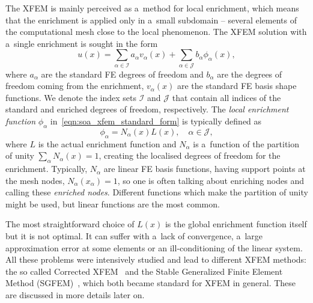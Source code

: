 The XFEM is mainly perceived as a~method for local enrichment, which means that the enrichment is applied only
in a~small subdomain -- several elements of the computational mesh close to the local phenomenon.
The XFEM solution with a~single enrichment is sought in the form
\begin{equation} \label{eqn:soa_xfem_standard_form}
  u(x) = \sum_{\alpha\in\mathcal{I}}a_\alpha v_\alpha(x)
    + \sum_{\alpha\in\mathcal{J}} b_{\alpha} \phi_{\alpha}(x),
\end{equation}
where $a_\alpha$ are the standard FE degrees of freedom and $b_{\alpha}$ are the degrees of freedom coming from
the enrichment, $v_\alpha(x)$ are the standard FE basis shape functions. We denote the index sets $\mathcal{I}$ and
$\mathcal{J}$ that contain all indices of the standard and enriched degrees of freedom, respectively.
The \emph{local enrichment function} $\phi_{\alpha}$ in~\eqref{eqn:soa_xfem_standard_form} is typically defined as
\begin{equation} \label{eqn:soa_xfem_enrich}
    \phi_{\alpha} = N_\alpha(x)L(x), \quad \alpha\in\mathcal{J},
\end{equation}
where $L$ is the actual enrichment function and $N_\alpha$ is a~function of the partition of unity
$\sum_\alpha N_\alpha(x) = 1$, creating the localised degrees of freedom for the enrichment.
Typically, $N_\alpha$ are linear FE basis functions, having support points at the mesh nodes, $N_\alpha(x_\alpha)=1$,
so one is often talking about enriching nodes and calling these \emph{enriched nodes}.
Different functions which make the partition of unity might be used, but linear functions are the most common.


The most straightforward choice of $L(x)$ is the global enrichment function itself but it is not optimal. It can suffer with a~lack of convergence, a~large approximation error at some elements or an ill-conditioning of the linear system.
All these problems were intensively studied and lead to different XFEM methods:
the so called Corrected XFEM~\cite{fries_corrected_2008}
and the Stable Generalized Finite Element Method (SGFEM)~\cite{babuska_stable_2012, gupta_stable_2013}, which 
both became standard for XFEM in general. These are discussed in more details later on.

